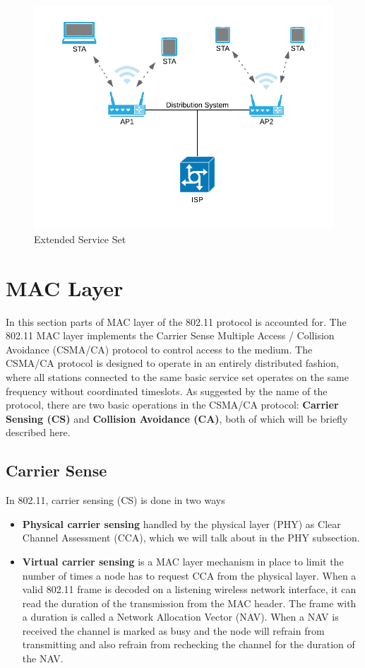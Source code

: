 		 \begin{figure}
			 \center
			 \includegraphics[scale=1]{Images/ESS.png}
			 \caption{Extended Service Set}
			 \label{fig:extendedserviceset}
		 \end{figure}


     \section{MAC Layer}
		 In this section parts of MAC layer of the 802.11 protocol is accounted for.  
     The 802.11 MAC layer implements the Carrier Sense Multiple Access / Collision Avoidance (CSMA/CA) protocol to control access to the medium.
     The CSMA/CA protocol is designed to operate in an entirely distributed fashion, where all stations connected to the same basic service set operates on
     the same frequency without coordinated timeslots. As suggested by the name of the protocol, there are two basic operations in the CSMA/CA protocol:
     \textbf{Carrier Sensing (CS)} and \textbf{Collision Avoidance (CA)}, both of which will be briefly described here.

     \subsection{Carrier Sense}
     In 802.11, carrier sensing (CS) is done in two ways
     \begin{itemize}
     \item \textbf{Physical carrier sensing} handled by the physical layer (PHY) as Clear Channel Assessment (CCA), which we will talk about in the PHY subsection.
     \item \textbf{Virtual carrier sensing} is a MAC layer mechanism in place to limit the number of times
     a node has to request CCA from the physical layer. When a valid 802.11 frame is decoded on a listening wireless network interface, it can read the duration of
     the transmission from the MAC header. The frame with a duration is called a Network Allocation Vector (NAV). When a NAV is received 
     the channel is marked as busy and the node will refrain from transmitting and also refrain from rechecking the channel for the duration of the NAV. 
     \end{itemize} 


